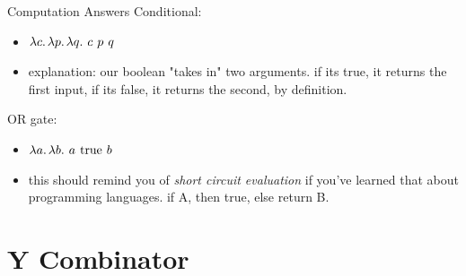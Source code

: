 \documentclass[aspectratio=169]{beamer}
\begin{document}
\begin{frame}{Computation Answers}
Conditional: \pause
\begin{itemize}
\item $\lambda c . \hspace{0.02in} \lambda p . \hspace{0.02in} \lambda q . \hspace{0.05in} c\hspace{0.05in} p\hspace{0.05in} q$ \pause
\item explanation: our boolean "takes in" two arguments. if its true, it returns the first input, if its false, it returns the second, by definition.
\end{itemize}
OR gate: \pause
\begin{itemize}
\item $\lambda a . \hspace{0.02in} \lambda b . \hspace{0.05in} a \hspace{0.05in} \text{true} \hspace{0.05in} b$
\item this should remind you of \textit{short circuit evaluation} if you've learned that about programming languages. if A, then true, else return B.
\end{itemize}
\end{frame}

\section{Y Combinator}
\frame{\sectionpage}
\end{document}
